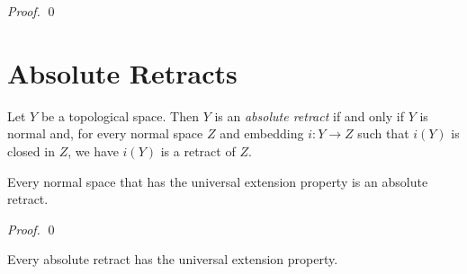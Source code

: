 \begin{proof}
    \pf
    \qed
\end{proof}

\section{Absolute Retracts}

\begin{definition}
    Let $Y$ be a topological space. Then $Y$ is an \emph{absolute retract} if and only if $Y$ is normal and,
    for every normal space $Z$ and embedding $i : Y \rightarrow Z$ such that $i(Y)$ is closed in $Z$,
    we have $i(Y)$ is a retract of $Z$.
\end{definition}

\begin{proposition}
    Every normal space that has the universal extension property is an absolute retract.
\end{proposition}

\begin{proof}
    \pf
    \qed
\end{proof}

\begin{proposition}[Choice]
    Every absolute retract has the universal extension property.
\end{proposition}

